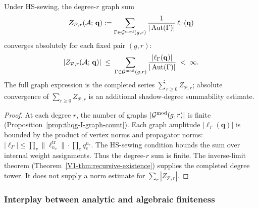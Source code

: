 \begin{proposition}
Under HS-sewing, the degree-$r$ graph sum
\[
Z_{\mathcal{P},r}(\mathcal{A};\,\mathbf{q})
:=
\sum_{\Gamma \in \mathcal{G}^{\mathrm{mod}}(g,r)}
\frac{1}{|\operatorname{Aut}(\Gamma)|}\,\ell_\Gamma(\mathbf{q})
\]
converges absolutely for each fixed pair $(g,r)$:
\begin{equation}%
|Z_{\mathcal{P},r}(\cA;\,\mathbf{q})| \;\leq\; \sum_{\Gamma \in \Gmod(g,r)} \frac{|\ell_\Gamma(\mathbf{q})|}{|\Aut(\Gamma)|} \;<\; \infty.
\end{equation}
The full graph expression is the completed series
$\widehat{\sum}_{r \geq 0} Z_{\mathcal{P},r}$; absolute convergence
of $\sum_{r \geq 0} Z_{\mathcal{P},r}$ is an additional
shadow-degree summability estimate.
\end{proposition}

\begin{proof}
At each degree $r$, the number of graphs $|\mathcal{G}^{\mathrm{mod}}(g,r)|$ is finite
(Proposition~\ref{prop:thqg-I-graph-count}). Each graph amplitude
$|\ell_\Gamma(\mathbf{q})|$ is bounded by the product of vertex norms
and propagator norms:
$|\ell_\Gamma| \leq \prod_{v} \|\ell_{n_v}^{\mathrm{tr}}\|
\cdot \prod_{e} q_e^{n_e}$. The HS-sewing condition bounds the sum
over internal weight assignments. Thus the degree-$r$ sum is finite.
The inverse-limit theorem
(Theorem~\ref{V1-thm:recursive-existence}) supplies the completed
degree tower. It does not supply a norm estimate for
$\sum_r |Z_{\mathcal{P},r}|$.
\end{proof}

\subsubsection{Interplay between analytic and algebraic finiteness}


